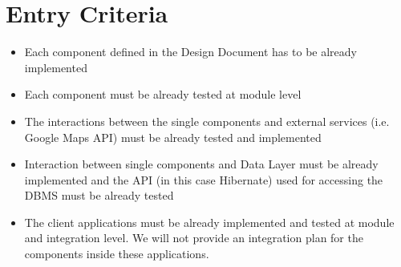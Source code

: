 \section{Entry Criteria}
\begin{itemize}
	\item Each component defined in the Design Document has to be already implemented
	\item Each component must be already tested at module level
	\item The interactions between the single components and external services (i.e. Google Maps API) must be already tested and implemented
	\item Interaction between single components and Data Layer must be already implemented and the API (in this case Hibernate) used for accessing the DBMS must be already tested
	\item The client applications must be already implemented and tested at module and integration level. We will not provide an integration plan for the components inside these applications. 
\end{itemize}